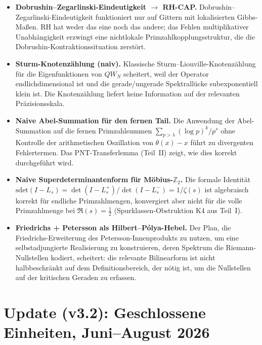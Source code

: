 \documentclass[12pt,a4paper]{article}
\theoremstyle{definition}
\theoremstyle{remark}
\begin{document}
\begin{itemize}
  \item \textbf{Dobrushin--Zegarlinski-Eindeutigkeit $\to$ RH-CAP.}
    Dobrushin--Zegarlinski-Eindeutigkeit funktioniert nur auf Gittern
    mit lokalisierten Gibbs-Maßen. RH hat weder das eine noch das
    andere; das Fehlen multiplikativer Unabhängigkeit erzwingt eine
    nichtlokale Primzahlkopplungsstruktur, die die
    Dobrushin-Kontraktionssituation zerstört.

  \item \textbf{Sturm-Knotenzählung (naiv).} Klassische
    Sturm--Liouville-Knotenzählung für die Eigenfunktionen von $QW_N$
    scheitert, weil der Operator endlichdimensional ist und die
    gerade/ungerade Spektrallücke subexponentiell klein ist. Die
    Knotenzählung liefert keine Information auf der relevanten
    Präzisionsskala.

  \item \textbf{Naive Abel-Summation für den fernen Tail.} Die
    Anwendung der Abel-Summation auf die fernen Primzahlsummen
    $\sum_{p>\lambda} (\log p)^k / p^s$ ohne Kontrolle der
    arithmetischen Oszillation von $\theta(x)-x$ führt zu divergenten
    Fehlertermen. Das PNT-Transferlemma (Teil~II) zeigt, wie dies
    korrekt durchgeführt wird.

  \item \textbf{Naive Superdeterminantenform für Möbius-$\mathbb{Z}_2$.}
    Die formale Identität
    $\mathrm{sdet}(I - L_s) = \det(I-L_s^+)/\det(I-L_s^-) = 1/\zeta(s)$
    ist algebraisch korrekt für endliche Primzahlmengen, konvergiert aber
    nicht für die volle Primzahlmenge bei $\Re(s) = \tfrac{1}{2}$
    (Spurklassen-Obstruktion K4 aus Teil~I).

  \item \textbf{Friedrichs + Petersson als Hilbert--P\'olya-Hebel.}
    Der Plan, die Friedrichs-Erweiterung des Petersson-Innenprodukts zu
    nutzen, um eine selbstadjungierte Realisierung zu konstruieren,
    deren Spektrum die Riemann-Nullstellen kodiert, scheitert: die
    relevante Bilinearform ist nicht halbbeschränkt auf dem Definitionsbereich, der nötig ist, um die Nullstellen auf der
    kritischen Geraden zu erfassen.
\end{itemize}


\section{Update (v3.2): Geschlossene Einheiten, Juni--August 2026}
\label{sec:v32-update}
\end{document}
